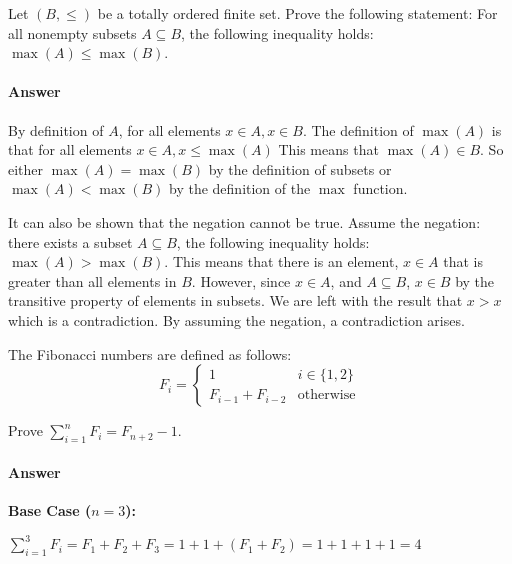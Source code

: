 \documentclass{article}
\begin{document}
 

Let $(B,\leq)$ be a totally ordered finite set. Prove the following
statement: For all nonempty subsets $A \subseteq B$, the following inequality
holds: $\max(A) \leq \max(B)$.

\paragraph{Answer}

By definition of $A$, for all elements $x \in A, x\in B$. The definition of $\max(A)$ is that for all elements $x \in A, x \leq \max(A)$
This means that $\max(A) \in B$. So either $\max(A) = \max(B)$ by the definition of subsets or $ \max(A) < \max(B)$ by the definition of the $\max$ function.

It can also be shown that the negation cannot be true. Assume the negation: there exists a subset  $A \subseteq B$, the following inequality
holds: $\max(A) > \max(B)$. This means that there is an element, $x \in A$ that is greater than all elements in $B$. However, since $x \in A$,
 and $A \subseteq B$, $x \in B$ by the transitive property of elements in subsets. We are left with the result that $x>x$ which is a contradiction. 
 By assuming the negation, a contradiction arises.

 

The Fibonacci numbers are defined as follows:
$$
    F_i = \begin{cases}
            1 & i \in \{1,2\} \\
            F_{i-1}+F_{i-2} & \text{otherwise}
          \end{cases}
$$

Prove $\sum_{i=1}^n F_i = F_{n+2}-1$.

\paragraph{Answer}
\textbf{Base Case ($n=3$):}

$\sum_{i=1}^3F_i = F_1 + F_2 +F_3 = 1 + 1 + (F_1 + F_2) = 1+1+1+1 = 4$
\end{document}
